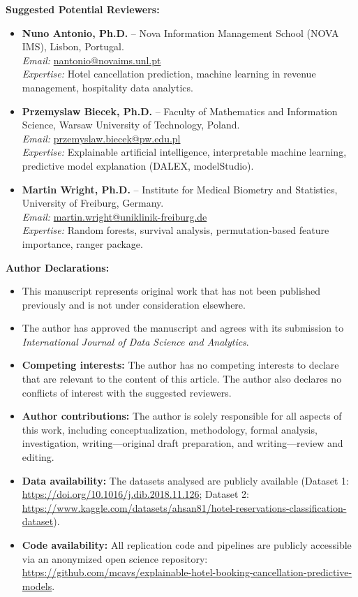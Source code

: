 \documentclass[10.5pt,a4paper]{article}
\begin{document}
\textbf{Suggested Potential Reviewers:}
\begin{itemize}
    \setlength{\itemsep}{0pt}
    \setlength{\parskip}{1pt}
    \item \textbf{Nuno Antonio, Ph.D.} -- Nova Information Management School (NOVA IMS), Lisbon, Portugal. \\
    \textit{Email:} \href{mailto:nantonio@novaims.unl.pt}{nantonio@novaims.unl.pt} \\
    \textit{Expertise:} Hotel cancellation prediction, machine learning in revenue management, hospitality data analytics.
    \item \textbf{Przemyslaw Biecek, Ph.D.} -- Faculty of Mathematics and Information Science, Warsaw University of Technology, Poland. \\
    \textit{Email:} \href{mailto:przemyslaw.biecek@pw.edu.pl}{przemyslaw.biecek@pw.edu.pl} \\
    \textit{Expertise:} Explainable artificial intelligence, interpretable machine learning, predictive model explanation (DALEX, modelStudio).
    \item \textbf{Martin Wright, Ph.D.} -- Institute for Medical Biometry and Statistics, University of Freiburg, Germany. \\
    \textit{Email:} \href{mailto:martin.wright@uniklinik-freiburg.de}{martin.wright@uniklinik-freiburg.de} \\
    \textit{Expertise:} Random forests, survival analysis, permutation-based feature importance, ranger package.
\end{itemize}

\textbf{Author Declarations:}
\begin{itemize}
    \setlength{\itemsep}{0pt}
    \setlength{\parskip}{1pt}
    \item This manuscript represents original work that has not been published previously and is not under consideration elsewhere.
    \item The author has approved the manuscript and agrees with its submission to \textit{International Journal of Data Science and Analytics}.
    \item \textbf{Competing interests:} The author has no competing interests to declare that are relevant to the content of this article. The author also declares no conflicts of interest with the suggested reviewers.
    \item \textbf{Author contributions:} The author is solely responsible for all aspects of this work, including conceptualization, methodology, formal analysis, investigation, writing---original draft preparation, and writing---review and editing.
    \item \textbf{Data availability:} The datasets analysed are publicly available (Dataset 1: \url{https://doi.org/10.1016/j.dib.2018.11.126}; Dataset 2: \url{https://www.kaggle.com/datasets/ahsan81/hotel-reservations-classification-dataset}).
    \item \textbf{Code availability:} All replication code and pipelines are publicly accessible via an anonymized open science repository: \url{https://github.com/mcavs/explainable-hotel-booking-cancellation-predictive-models}.
\end{itemize}
\end{document}
